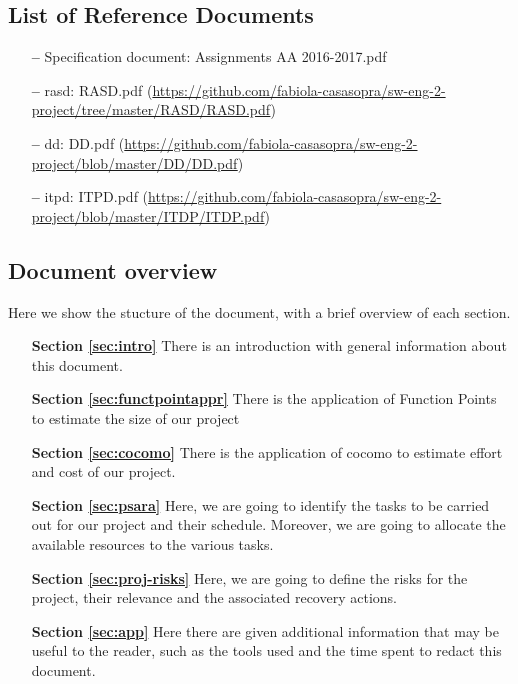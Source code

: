 \subsection{List of Reference Documents}

\begin{itemize}
\item[\textbf{--}] Specification document: Assignments AA 2016-2017.pdf
\item[\textbf{--}] \acl{rasd}: RASD.pdf 
\newline
(\url{https://github.com/fabiola-casasopra/sw-eng-2-project/tree/master/RASD/RASD.pdf})
\item[\textbf{--}] \acl{dd}: DD.pdf 
\newline
(\url{https://github.com/fabiola-casasopra/sw-eng-2-project/blob/master/DD/DD.pdf})
\item[\textbf{--}] \acl{itpd}: ITPD.pdf 
\newline
(\url{https://github.com/fabiola-casasopra/sw-eng-2-project/blob/master/ITDP/ITDP.pdf})
\end{itemize}

\subsection{Document overview}

Here we show the stucture of the document, with a brief overview of each section.

\begin{itemize}

\item[\textbf{Section \ref{sec:intro}}]There is an introduction with general information about this document.

\item[\textbf{Section \ref{sec:functpointappr}}]There is the application of Function Points to estimate the size of our project  

\item[\textbf{Section \ref{sec:cocomo}}]There is the application of \acs{cocomo} to estimate effort and cost of our project.

\item[\textbf{Section \ref{sec:psara}}]Here, we are going to identify the tasks to be carried out for our project and their schedule. Moreover, we are going to allocate the available resources to the various tasks.

\item[\textbf{Section \ref{sec:proj-risks}}]Here, we are going to define the risks for the project, their relevance and the associated recovery actions.

\item[\textbf{Section \ref{sec:app}}]Here there are given additional information that may be useful to the reader, such as the tools used and the time spent to redact this document.
\end{itemize}